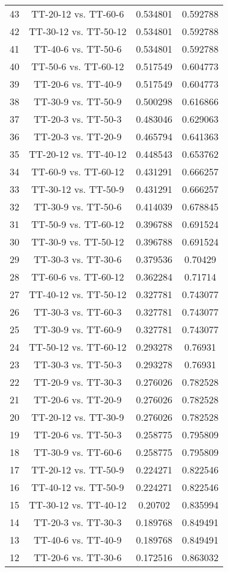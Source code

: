 \documentclass[a4paper,10pt]{article}
\begin{document}
\begin{landscape}
\begin{table}[!htp]
\begin{tabular}{cccc}
43&TT-20-12 vs. TT-60-6&0.534801&0.592788\\
42&TT-30-12 vs. TT-50-12&0.534801&0.592788\\
41&TT-40-6 vs. TT-50-6&0.534801&0.592788\\
40&TT-50-6 vs. TT-60-12&0.517549&0.604773\\
39&TT-20-6 vs. TT-40-9&0.517549&0.604773\\
38&TT-30-9 vs. TT-50-9&0.500298&0.616866\\
37&TT-20-3 vs. TT-50-3&0.483046&0.629063\\
36&TT-20-3 vs. TT-20-9&0.465794&0.641363\\
35&TT-20-12 vs. TT-40-12&0.448543&0.653762\\
34&TT-60-9 vs. TT-60-12&0.431291&0.666257\\
33&TT-30-12 vs. TT-50-9&0.431291&0.666257\\
32&TT-30-9 vs. TT-50-6&0.414039&0.678845\\
31&TT-50-9 vs. TT-60-12&0.396788&0.691524\\
30&TT-30-9 vs. TT-50-12&0.396788&0.691524\\
29&TT-30-3 vs. TT-30-6&0.379536&0.70429\\
28&TT-60-6 vs. TT-60-12&0.362284&0.71714\\
27&TT-40-12 vs. TT-50-12&0.327781&0.743077\\
26&TT-30-3 vs. TT-60-3&0.327781&0.743077\\
25&TT-30-9 vs. TT-60-9&0.327781&0.743077\\
24&TT-50-12 vs. TT-60-12&0.293278&0.76931\\
23&TT-30-3 vs. TT-50-3&0.293278&0.76931\\
22&TT-20-9 vs. TT-30-3&0.276026&0.782528\\
21&TT-20-6 vs. TT-20-9&0.276026&0.782528\\
20&TT-20-12 vs. TT-30-9&0.276026&0.782528\\
19&TT-20-6 vs. TT-50-3&0.258775&0.795809\\
18&TT-30-9 vs. TT-60-6&0.258775&0.795809\\
17&TT-20-12 vs. TT-50-9&0.224271&0.822546\\
16&TT-40-12 vs. TT-50-9&0.224271&0.822546\\
15&TT-30-12 vs. TT-40-12&0.20702&0.835994\\
14&TT-20-3 vs. TT-30-3&0.189768&0.849491\\
13&TT-40-6 vs. TT-40-9&0.189768&0.849491\\
12&TT-20-6 vs. TT-30-6&0.172516&0.863032\\

\end{tabular}
\end{table}
\end{landscape}
\end{document}
